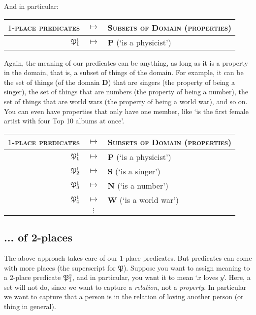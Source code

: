 And in particular: 

\begin{center}
	\begin{tabular}{rcl}
		$1$-\textsc{place predicates} & $\mapsto$ & \textsc{Subsets of Domain (properties)}\\\hline
		$\mathfrak{P}^{1}_{1}$ & $\mapsto$ & $\mathbf{P}$ (`is a physicist')
	\end{tabular}
\end{center} 

Again, the meaning of our predicates can be anything, as long as it is a property in the domain, that is, a subset of things of the domain. For example, it can be the set of things (of the domain $\mathbf{D}$) that are singers (the property of being a singer), the set of things that are numbers (the property of being a number), the set of things that are world wars (the property of being a world war), and so on. You can even have properties that only have one member, like `is the first female artist with four Top 10 albums at once'. 

\begin{center}
	\begin{tabular}{rcl}
		$1$-\textsc{place predicates} & $\mapsto$ & \textsc{Subsets of Domain (properties)}\\\hline
		$\mathfrak{P}^{1}_{1}$ & $\mapsto$ & $\mathbf{P}$ (`is a physicist')\\
		$\mathfrak{P}^{1}_{2}$ & $\mapsto$ & $\mathbf{S}$ (`is a singer')\\
		$\mathfrak{P}^{1}_{3}$ & $\mapsto$ & $\mathbf{N}$ (`is a number')\\
		$\mathfrak{P}^{1}_{4}$ & $\mapsto$ & $\mathbf{W}$ (`is a world war')\\
		& $\vdots$ & 
	\end{tabular}
\end{center} 

\subsection{... of 2-places}

The above approach takes care of our $1$-place predicates. But predicates can come with more places (the superscript for $\mathfrak{P}$). Suppose you want to assign meaning to a $2$-place predicate $\mathfrak{P}^{2}_{1}$, and in particular, you want it to mean `$x$ loves $y$'. Here, a set will not do, since we want to capture a \textit{relation}, not a \textit{property}. In particular we want to capture that a person is in the relation of loving another person (or thing in general). 

